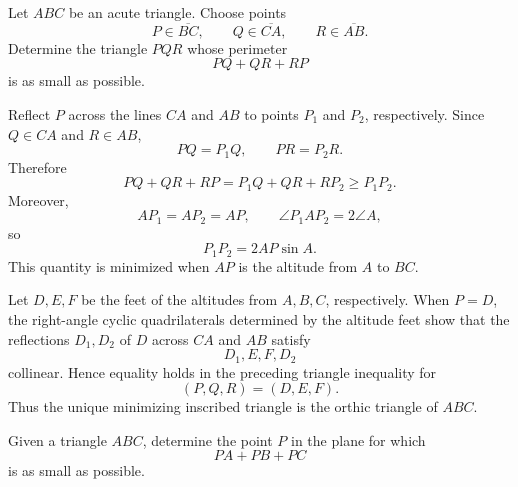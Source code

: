     \begin{expectedproblem}
        Let $ABC$ be an acute triangle. Choose points
        \[
            P\in\overline{BC},
            \qquad
            Q\in\overline{CA},
            \qquad
            R\in\overline{AB}.
        \]
        Determine the triangle $PQR$ whose perimeter
        \[
            PQ+QR+RP
        \]
        is as small as possible.
    \end{expectedproblem}

    \begin{solution}
        Reflect $P$ across the lines $CA$ and $AB$ to points $P_1$ and $P_2$,
        respectively. Since $Q\in CA$ and $R\in AB$,
        \[
            PQ=P_1Q,
            \qquad
            PR=P_2R.
        \]
        Therefore
        \[
            PQ+QR+RP
            =
            P_1Q+QR+RP_2
            \geq
            P_1P_2.
        \]
        Moreover,
        \[
            AP_1=AP_2=AP,
            \qquad
            \angle P_1AP_2=2\angle A,
        \]
        so
        \[
            P_1P_2=2AP\sin A.
        \]
        This quantity is minimized when $AP$ is the altitude from $A$ to
        $BC$.

        Let $D,E,F$ be the feet of the altitudes from $A,B,C$, respectively.
        When $P=D$, the right-angle cyclic quadrilaterals determined by the
        altitude feet show that the reflections $D_1,D_2$ of $D$ across $CA$
        and $AB$ satisfy
        \[
            D_1,E,F,D_2
        \]
        collinear. Hence equality holds in the preceding triangle inequality
        for
        \[
            (P,Q,R)=(D,E,F).
        \]
        Thus the unique minimizing inscribed triangle is the orthic triangle of
        $ABC$.
    \end{solution}

    \begin{expectedproblem}
        Given a triangle $ABC$, determine the point $P$ in the plane for which
        \[
            PA+PB+PC
        \]
        is as small as possible.
    \end{expectedproblem}

